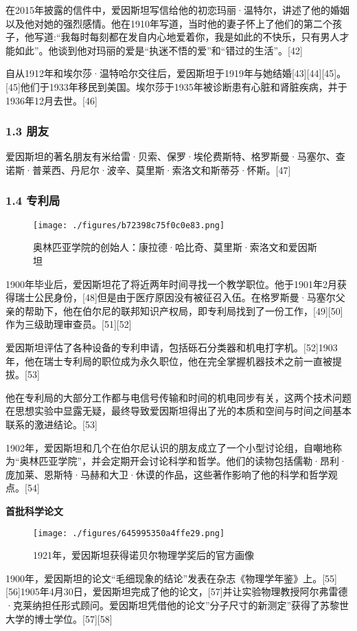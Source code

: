 在2015年披露的信件中，爱因斯坦写信给他的初恋玛丽·温特尔，讲述了他的婚姻以及他对她的强烈感情。他在1910年写道，当时他的妻子怀上了他们的第二个孩子，他写道:“我每时每刻都在发自内心地爱着你，我是如此的不快乐，只有男人才能如此”。他谈到他对玛丽的爱是“执迷不悟的爱”和“错过的生活”。[42]

自从1912年和埃尔莎·温特哈尔交往后，爱因斯坦于1919年与她结婚[43][44][45]。[45]他们于1933年移民到美国。埃尔莎于1935年被诊断患有心脏和肾脏疾病，并于1936年12月去世。[46]

\subsubsection{1.3 朋友}
爱因斯坦的著名朋友有米给雷·贝索、保罗·埃伦费斯特、格罗斯曼·马塞尔、查诺斯·普莱西、丹尼尔·波辛、莫里斯·索洛文和斯蒂芬·怀斯。[47]

\subsubsection{1.4 专利局}
\begin{figure}[ht]
\centering
\texttt{[image: ./figures/b72398c75f0c0e83.png]}
\caption{奥林匹亚学院的创始人：康拉德·哈比奇、莫里斯·索洛文和爱因斯坦} \label{fig_AYST_6}
\end{figure}
1900年毕业后，爱因斯坦花了将近两年时间寻找一个教学职位。他于1901年2月获得瑞士公民身份，[48]但是由于医疗原因没有被征召入伍。在格罗斯曼·马塞尔父亲的帮助下，他在伯尔尼的联邦知识产权局，即专利局找到了一份工作，[49][50]作为三级助理审查员。[51][52]

爱因斯坦评估了各种设备的专利申请，包括砾石分类器和机电打字机。[52]1903年，他在瑞士专利局的职位成为永久职位，他在完全掌握机器技术之前一直被提拔。[53]

他在专利局的大部分工作都与电信号传输和时间的机电同步有关，这两个技术问题在思想实验中显露无疑，最终导致爱因斯坦得出了光的本质和空间与时间之间基本联系的激进结论。[53]

1902年，爱因斯坦和几个在伯尔尼认识的朋友成立了一个小型讨论组，自嘲地称为“奥林匹亚学院”，并会定期开会讨论科学和哲学。他们的读物包括儒勒·昂利·庞加莱、恩斯特·马赫和大卫·休谟的作品，这些著作影响了他的科学和哲学观点。[54]

\textbf{首批科学论文}

\begin{figure}[ht]
\centering
\texttt{[image: ./figures/645995350a4ffe29.png]}
\caption{1921年，爱因斯坦获得诺贝尔物理学奖后的官方画像} \label{fig_AYST_7}
\end{figure}
1900年，爱因斯坦的论文“毛细现象的结论”发表在杂志《物理学年鉴》上。[55][56]1905年4月30日，爱因斯坦完成了他的论文，[57]并让实验物理教授阿尔弗雷德·克莱纳担任形式顾问。爱因斯坦凭借他的论文”分子尺寸的新测定”获得了苏黎世大学的博士学位。[57][58]


